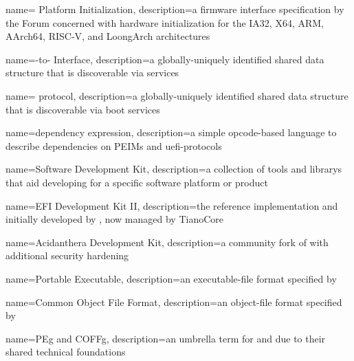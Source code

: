 {
  name={ Platform Initialization},
  description={a \gls{firmware} interface specification by the  Forum concerned with hardware initialization for the IA32, X64, ARM, AArch64, RISC-V, and LoongArch  architectures}
}

{
  name={-to- Interface},
  description={a globally-uniquely identified shared data structure that is discoverable via  services}
}

{
  name={ protocol},
  description={a globally-uniquely identified shared data structure that is discoverable via  boot services}
}

{
  name={dependency expression},
  description={a simple opcode-based language to describe dependencies on \glspl{PEIM} and \glspl{uefi-protocol}}
}

{
  name={Software Development Kit},
  description={a collection of tools and \glspl{library} that aid developing for a specific software platform or product}
}

{
  name={EFI Development Kit II},
  description={the  reference implementation and  initially developed by , now managed by TianoCore}
}

{
  name={Acidanthera  Development Kit},
  description={a community fork of  with additional security hardening}
}

{
  name={Portable Executable},
  description={an \gls{executable-file} format specified by }
}

{
  name={Common Object File Format},
  description={an \gls{object-file} format specified by }
}

{
  name={\gls{PEg} and \gls{COFFg}},
  description={an umbrella term for  and  due to their shared technical foundations}
}

